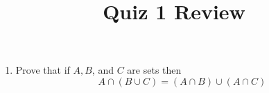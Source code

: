 \documentclass[10pt,a4paper,oneside]{book}
\title{Quiz 1 Review}
\author{}
\date{}
\begin{document}
\maketitle

\begin{enumerate}
    \item Prove that if $A,B$, and $C$ are sets then 
    \[ A\cap (B\cup C) = (A\cap B)\cup (A\cap C)\]


 
\end{enumerate}
\end{document}
